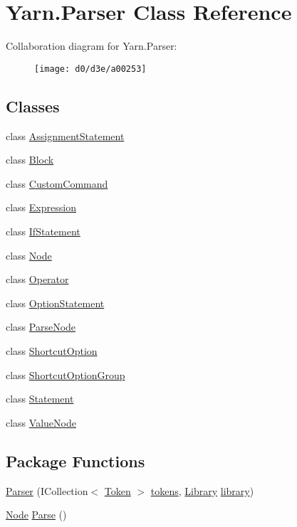 \hypertarget{a00064}{\section{Yarn.\-Parser Class Reference}
\label{a00064}
}


Collaboration diagram for Yarn.\-Parser\-:
\nopagebreak
\begin{figure}[H]
\begin{center}
\leavevmode
\texttt{[image: d0/d3e/a00253]}
\end{center}
\end{figure}
\subsection*{Classes}
\begin{DoxyCompactItemize}
\item 
class \hyperlink{a00019}{Assignment\-Statement}
\item 
class \hyperlink{a00022}{Block}
\item 
class \hyperlink{a00032}{Custom\-Command}
\item 
class \hyperlink{a00040}{Expression}
\item 
class \hyperlink{a00043}{If\-Statement}
\item 
class \hyperlink{a00054}{Node}
\item 
class \hyperlink{a00058}{Operator}
\item 
class \hyperlink{a00061}{Option\-Statement}
\item 
class \hyperlink{a00063}{Parse\-Node}
\item 
class \hyperlink{a00070}{Shortcut\-Option}
\item 
class \hyperlink{a00071}{Shortcut\-Option\-Group}
\item 
class \hyperlink{a00076}{Statement}
\item 
class \hyperlink{a00087}{Value\-Node}
\end{DoxyCompactItemize}
\subsection*{Package Functions}
\begin{DoxyCompactItemize}
\item 
\hyperlink{a00064_acd2714b911fb5e7c38f0e07a9dc1af58}{Parser} (I\-Collection$<$ \hyperlink{a00079}{Token} $>$ \hyperlink{a00064_a1a4de646937057988b59d2ff8035eae3}{tokens}, \hyperlink{a00049}{Library} \hyperlink{a00064_a1313951b09177a1c83b6cf035139197a}{library})
\item 
\hyperlink{a00054}{Node} \hyperlink{a00064_a811cc7226f4f4a2f3440cdb67ad14468}{Parse} ()
\end{DoxyCompactItemize}
